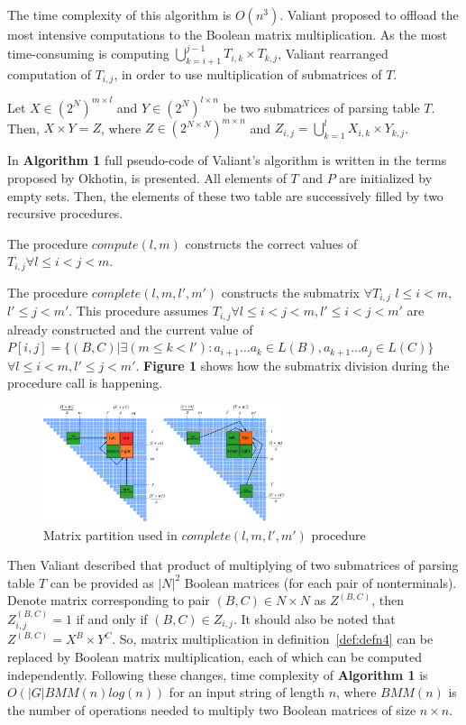 The time complexity of this algorithm is $O(n^3)$. Valiant proposed to offload the most intensive computations to the Boolean matrix multiplication. As the most time-consuming is computing $\bigcup\limits_{k = i + 1}^{j - 1} T_{i, k} \times T_{k, j}$, Valiant rearranged computation of $T_{i, j}$, in order to use multiplication of submatrices of $T$.

\begin{defn}\label{def:defn4} Let $X \in (2^N)^{m \times l}$ and $Y \in (2^N)^{l \times n}$ be two submatrices of parsing table $T$. Then, $X \times Y = Z$, where $Z \in (2^{N \times N})^{m \times n}$ and $Z_{i, j} = \bigcup\limits_{k = 1}^{l} X_{i, k} \times Y_{k, j}$.
\end{defn}

In \textbf{Algorithm 1} full pseudo-code of Valiant's algorithm is written in the terms proposed by Okhotin, is presented. All elements of $T$ and $P$ are initialized by empty sets. Then, the elements of these two table are successively filled by two recursive procedures.

The procedure $compute(l, m)$ constructs the correct values of $T_{i,j} \forall l \le i < j < m$.

The procedure $complete(l, m, l', m')$ constructs the submatrix $\forall T_{i, j}$ $l \le i < m$, $l' \le j < m'$. This procedure assumes $T_{i, j} \forall l \leq i < j < m,  l' \leq i < j < m'$ are already constructed and the current value of  $P[i, j] =  \{ (B, C) |\exists (m \le k < l'): a_{i + 1} \dots a_{k} \in L(B), a_{k + 1} \dots a_{j} \in L(C)\}$ $\forall l \leq i < m,  l' \leq j < m'$. \textbf{Figure 1} shows how the submatrix division during the procedure call is happening.

\begin{figure}[h]
\centering
\includegraphics[width=200pt]{splitting.pdf}
\centering
\caption{Matrix partition used in $complete(l, m, l', m')$ procedure} \label{fig1}
\end{figure}

Then Valiant described that product of multiplying of two submatrices of parsing table $T$ can be provided as $|N|^2$ Boolean matrices (for each pair of nonterminals). Denote matrix corresponding to pair $(B, C) \in N \times N$ as $Z^{(B, C)}$, then $Z_{i, j}^{(B, C)} = 1$ if and only if $(B, C) \in Z_{i, j}$. It should also be noted that $Z^{(B, C)} = X^{B} \times Y^{C}$. So, matrix multiplication in definition~\ref{def:defn4} can be replaced by Boolean matrix multiplication, each of which can be computed independently. Following these changes, time complexity of \textbf{Algorithm 1} is $O(|G|BMM(n)log(n))$ for an input string of length $n$, where $BMM(n)$ is the number of operations needed to multiply two Boolean matrices of size $n \times n$.
